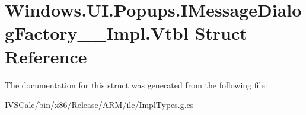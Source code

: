 \hypertarget{struct_windows_1_1_u_i_1_1_popups_1_1_i_message_dialog_factory_____impl_1_1_vtbl}{}\section{Windows.\+U\+I.\+Popups.\+I\+Message\+Dialog\+Factory\+\_\+\+\_\+\+Impl.\+Vtbl Struct Reference}
\label{struct_windows_1_1_u_i_1_1_popups_1_1_i_message_dialog_factory_____impl_1_1_vtbl}


The documentation for this struct was generated from the following file\+:\begin{DoxyCompactItemize}
\item 
I\+V\+S\+Calc/bin/x86/\+Release/\+A\+R\+M/ilc/Impl\+Types.\+g.\+cs\end{DoxyCompactItemize}
